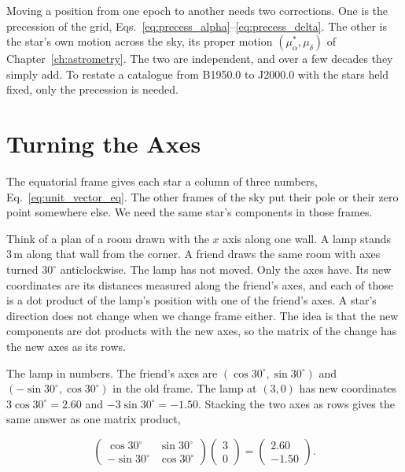 Moving a position from one epoch to another needs two corrections. One is the precession of the grid, Eqs.~\eqref{eq:precess_alpha}--\eqref{eq:precess_delta}. The other is the star's own motion across the sky, its proper motion $(\mu_\alpha^*,\mu_\delta)$ of Chapter~\ref{ch:astrometry}. The two are independent, and over a few decades they simply add. To restate a catalogue from B1950.0 to J2000.0 with the stars held fixed, only the precession is needed.

\section{Turning the Axes}
\label{co:sec:rotation}

The equatorial frame gives each star a column of three numbers, Eq.~\eqref{eq:unit_vector_eq}. The other frames of the sky put their pole or their zero point somewhere else. We need the same star's components in those frames.

Think of a plan of a room drawn with the $x$ axis along one wall. A lamp stands $3\,\mathrm m$ along that wall from the corner. A friend draws the same room with axes turned $30^\circ$ anticlockwise. The lamp has not moved. Only the axes have. Its new coordinates are its distances measured along the friend's axes, and each of those is a dot product of the lamp's position with one of the friend's axes. A star's direction does not change when we change frame either. The idea is that the new components are dot products with the new axes, so the matrix of the change has the new axes as its rows.

The lamp in numbers. The friend's axes are $(\cos30^\circ,\sin30^\circ)$ and $(-\sin30^\circ,\cos30^\circ)$ in the old frame. The lamp at $(3,0)$ has new coordinates $3\cos30^\circ=2.60$ and $-3\sin30^\circ=-1.50$. Stacking the two axes as rows gives the same answer as one matrix product,

\[
\begin{pmatrix}\cos30^\circ&\sin30^\circ\\-\sin30^\circ&\cos30^\circ\end{pmatrix}\begin{pmatrix}3\\0\end{pmatrix}=\begin{pmatrix}2.60\\-1.50\end{pmatrix}.
\]

